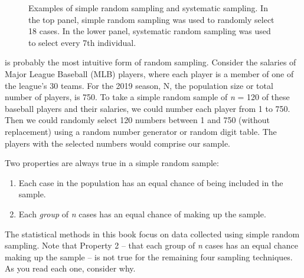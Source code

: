 \begin{figure}[p]
\centering
{}
\caption{Examples of simple random sampling and systematic sampling. In the top panel, simple random sampling was used to randomly select 18 cases. In the lower panel, systematic random sampling was used to select every 7th individual.}
\label{simple_systematic}
\end{figure}

 is probably the most intuitive form of random sampling. Consider the salaries of Major League Baseball (MLB) players, where each player is a member of one of the league's 30 teams. For the 2019 season, N, the population size or total number of players, is 750. To take a simple random sample of \textit{n} = 120 of these baseball players and their salaries, we could number each player from 1 to 750. Then we could randomly select 120 numbers between 1 and 750 (without replacement) using a random number generator or random digit table. The players with the selected numbers would comprise our sample.

Two properties are always true in a simple random sample:
\begin{enumerate}
\item Each case in the population has an equal chance of being included in the sample.
\item Each \emph{group} of \textit{n} cases has an equal chance of making up the sample.
\end{enumerate}

The statistical methods in this book focus on data collected using simple random sampling. Note that Property 2 -- that each group of \textit{n} cases has an equal chance making up the sample -- is not true for the remaining four sampling techniques. As you read each one, consider why.

